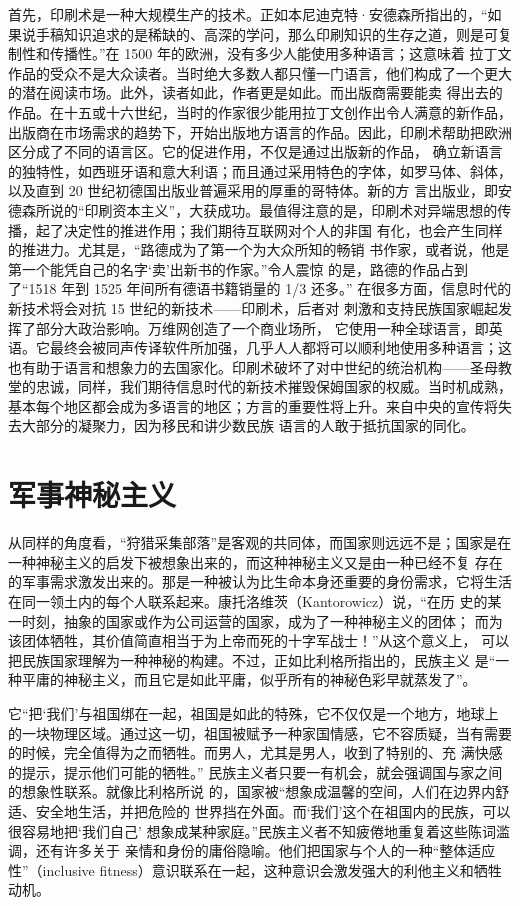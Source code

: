 首先，印刷术是一种大规模生产的技术。正如本尼迪克特·安德森所指出的，“如 果说手稿知识追求的是稀缺的、高深的学问，那么印刷知识的生存之道，则是可复制性和传播性。”在 1500 年的欧洲，没有多少人能使用多种语言；这意味着 拉丁文作品的受众不是大众读者。当时绝大多数人都只懂一门语言，他们构成了一个更大的潜在阅读市场。此外，读者如此，作者更是如此。而出版商需要能卖 得出去的作品。在十五或十六世纪，当时的作家很少能用拉丁文创作出令人满意的新作品，出版商在市场需求的趋势下，开始出版地方语言的作品。因此，印刷术帮助把欧洲区分成了不同的语言区。它的促进作用，不仅是通过出版新的作品， 确立新语言的独特性，如西班牙语和意大利语；而且通过采用特色的字体，如罗马体、斜体，以及直到 20 世纪初德国出版业普遍采用的厚重的哥特体。新的方 言出版业，即安德森所说的“印刷资本主义”，大获成功。最值得注意的是，印刷术对异端思想的传播，起了决定性的推进作用；我们期待互联网对个人的非国 有化，也会产生同样的推进力。尤其是，“路德成为了第一个为大众所知的畅销 书作家，或者说，他是第一个能凭自己的名字‘卖’出新书的作家。”令人震惊 的是，路德的作品占到了“1518 年到 1525 年间所有德语书籍销量的 1/3 还多。” 在很多方面，信息时代的新技术将会对抗 15 世纪的新技术——印刷术，后者对 刺激和支持民族国家崛起发挥了部分大政治影响。万维网创造了一个商业场所， 它使用一种全球语言，即英语。它最终会被同声传译软件所加强，几乎人人都将可以顺利地使用多种语言；这也有助于语言和想象力的去国家化。印刷术破坏了对中世纪的统治机构——圣母教堂的忠诚，同样，我们期待信息时代的新技术摧毁保姆国家的权威。当时机成熟，基本每个地区都会成为多语言的地区；方言的重要性将上升。来自中央的宣传将失去大部分的凝聚力，因为移民和讲少数民族 语言的人敢于抵抗国家的同化。

\section{军事神秘主义}
从同样的角度看，“狩猎采集部落”是客观的共同体，而国家则远远不是；国家是在一种神秘主义的启发下被想象出来的，而这种神秘主义又是由一种已经不复 存在的军事需求激发出来的。那是一种被认为比生命本身还重要的身份需求，它将生活在同一领土内的每个人联系起来。康托洛维茨（Kantorowicz）说，“在历 史的某一时刻，抽象的国家或作为公司运营的国家，成为了一种神秘主义的团体； 而为该团体牺牲，其价值简直相当于为上帝而死的十字军战士！”从这个意义上， 可以把民族国家理解为一种神秘的构建。不过，正如比利格所指出的，民族主义 是“一种平庸的神秘主义，而且它是如此平庸，似乎所有的神秘色彩早就蒸发了”。

它“把‘我们’与祖国绑在一起，祖国是如此的特殊，它不仅仅是一个地方，地球上的一块物理区域。通过这一切，祖国被赋予一种家国情感，它不容质疑，当有需要的时候，完全值得为之而牺牲。而男人，尤其是男人，收到了特别的、充 满快感的提示，提示他们可能的牺牲。” 民族主义者只要一有机会，就会强调国与家之间的想象性联系。就像比利格所说 的，国家被“想象成温馨的空间，人们在边界内舒适、安全地生活，并把危险的 世界挡在外面。而‘我们’这个在祖国内的民族，可以很容易地把‘我们自己’ 想象成某种家庭。”民族主义者不知疲倦地重复着这些陈词滥调，还有许多关于 亲情和身份的庸俗隐喻。他们把国家与个人的一种“整体适应性”（inclusive fitness）意识联系在一起，这种意识会激发强大的利他主义和牺牲动机。



